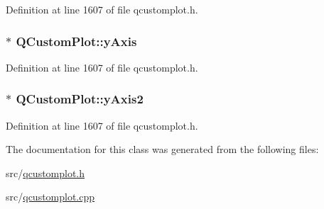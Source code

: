 Definition at line 1607 of file qcustomplot.\-h.

\hypertarget{class_q_custom_plot_af6fea5679725b152c14facd920b19367}{
\subsubsection[{y\-Axis}]{ $\ast$ Q\-Custom\-Plot\-::y\-Axis}}\label{class_q_custom_plot_af6fea5679725b152c14facd920b19367}


Definition at line 1607 of file qcustomplot.\-h.

\hypertarget{class_q_custom_plot_af13fdc5bce7d0fabd640f13ba805c0b7}{
\subsubsection[{y\-Axis2}]{ $\ast$ Q\-Custom\-Plot\-::y\-Axis2}}\label{class_q_custom_plot_af13fdc5bce7d0fabd640f13ba805c0b7}


Definition at line 1607 of file qcustomplot.\-h.



The documentation for this class was generated from the following files\-:\begin{DoxyCompactItemize}
\item 
src/\hyperlink{qcustomplot_8h}{qcustomplot.\-h}\item 
src/\hyperlink{qcustomplot_8cpp}{qcustomplot.\-cpp}\end{DoxyCompactItemize}

